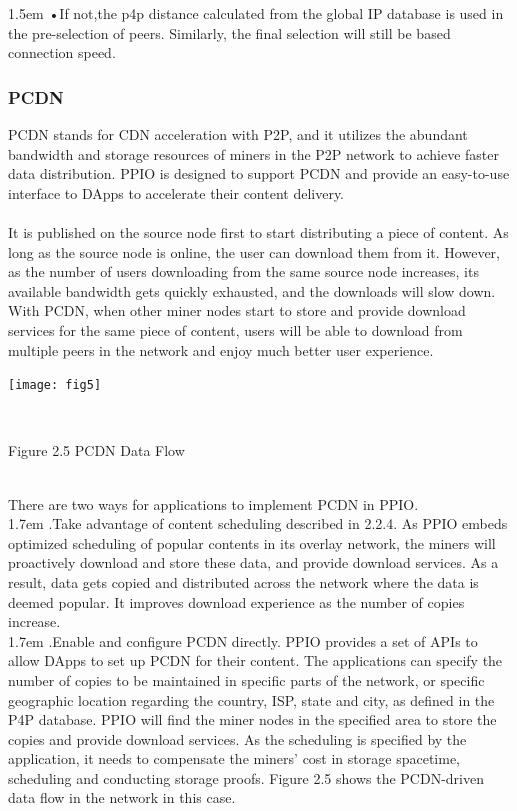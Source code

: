 \documentclass[10pt,a4paper]{article}
\begin{document}
\hangindent 1.5em
\noindent   
•\quad  If not,the p4p distance calculated from the global IP database is used in the pre-selection of peers. Similarly, the final selection will still be based connection speed.
\vspace{-0.8em}

 
         \subsubsection{PCDN}  %
PCDN stands for CDN acceleration with P2P, and it utilizes the abundant bandwidth and storage resources of miners in the P2P network to achieve faster data distribution. PPIO is designed to support PCDN and provide an easy-to-use interface to DApps to accelerate their content delivery. 
\vspace{-0.5em}
\\ \\It is published on the source node first to start distributing a piece of content. As long as the source node is online, the user can download them from it. However, as the number of users downloading from the same source node increases, its available bandwidth gets quickly exhausted, and the downloads will slow down. With PCDN, when other miner nodes start to store and provide download services for the same piece of content, users will be able to download from multiple peers in the network and enjoy much better user experience.\\
\centerline{\texttt{[image: fig5]}}
\vspace{-0.5em}
 \\ \centerline{{Figure 2.5 PCDN Data Flow}}
\vspace{-0.5em}
 \\ There are two ways for applications to implement PCDN in PPIO.
\vspace{-0.7em}
\\

\hangindent 1.7em
.\quad Take advantage of content scheduling described in 2.2.4.  As PPIO embeds optimized scheduling of popular contents in its overlay network,  the miners will proactively download and store these data, and provide download services. As a result, data gets copied and distributed across the network where the data is deemed popular. It improves download experience as the number of copies increase. 
\vspace{-0.7em}
\\

\hangindent 1.7em
.\quad Enable and configure PCDN directly. PPIO provides a set of APIs to allow DApps to set up PCDN for their content. The applications can specify the number of copies to be maintained in specific parts of the network, or specific geographic location regarding the country, ISP, state and city, as defined in the P4P database. PPIO will find the miner nodes in the specified area to store the copies and provide download services. As the scheduling is specified by the application, it needs to compensate the miners’ cost in storage spacetime, scheduling and conducting storage proofs. Figure 2.5 shows the PCDN-driven data flow in the network in this case.
\vspace{-1em}
\end{document}
